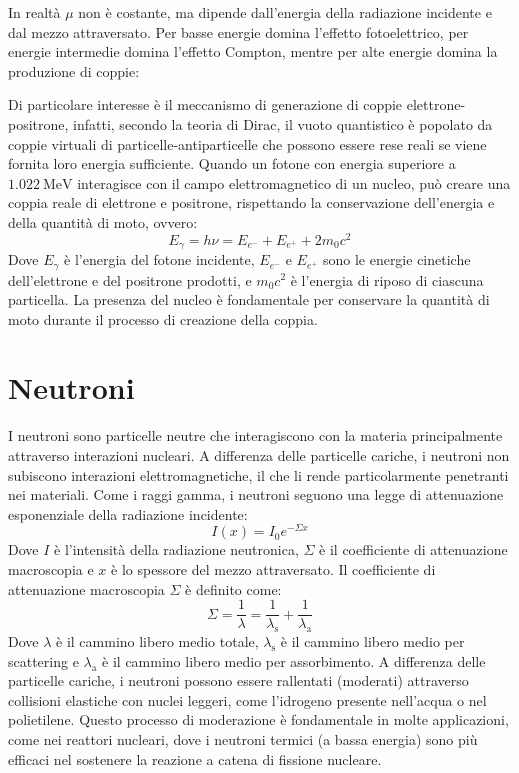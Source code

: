 
In realtà $\mu$ non è costante, ma dipende dall'energia della radiazione incidente e dal mezzo attraversato. Per basse energie domina l'effetto fotoelettrico, per energie intermedie domina l'effetto Compton, mentre per alte energie domina la produzione di coppie:


Di particolare interesse è il meccanismo di generazione di coppie elettrone-positrone, infatti, secondo la teoria di Dirac, il vuoto quantistico è popolato da coppie virtuali di particelle-antiparticelle che possono essere rese reali se viene fornita loro energia sufficiente. Quando un fotone con energia superiore a $\qty{1.022}{\mega\electronvolt}$ interagisce con il campo elettromagnetico di un nucleo, può creare una coppia reale di elettrone e positrone, rispettando la conservazione dell'energia e della quantità di moto, ovvero:
\begin{equation}
    E_{\gamma} = h\nu = E_{e^-} + E_{e^+} + 2m_0c^2
\end{equation}
Dove $E_{\gamma}$ è l'energia del fotone incidente, $E_{e^-}$ e $E_{e^+}$ sono le energie cinetiche dell'elettrone e del positrone prodotti, e $m_0c^2$ è l'energia di riposo di ciascuna particella. La presenza del nucleo è fondamentale per conservare la quantità di moto durante il processo di creazione della coppia.
\section{Neutroni}
I neutroni sono particelle neutre che interagiscono con la materia principalmente attraverso interazioni nucleari. A differenza delle particelle cariche, i neutroni non subiscono interazioni elettromagnetiche, il che li rende particolarmente penetranti nei materiali. Come i raggi gamma, i neutroni seguono una legge di attenuazione esponenziale della radiazione incidente:
\begin{equation}
    I(x) = I_0 e^{-\Sigma x}
\end{equation}
Dove $I$ è l'intensità della radiazione neutronica, $\Sigma$ è il coefficiente di attenuazione macroscopia e $x$ è lo spessore del mezzo attraversato. Il coefficiente di attenuazione macroscopia $\Sigma$ è definito come:
\begin{equation}
    \Sigma = \dfrac{1}{\lambda} = \dfrac{1}{\lambda_{\text{s}}} + \dfrac{1}{\lambda_{\text{a}}}
\end{equation}
Dove $\lambda$ è il cammino libero medio totale, $\lambda_{\text{s}}$ è il cammino libero medio per scattering e $\lambda_{\text{a}}$ è il cammino libero medio per assorbimento. A differenza delle particelle cariche, i neutroni possono essere rallentati (moderati) attraverso collisioni elastiche con nuclei leggeri, come l'idrogeno presente nell'acqua o nel polietilene. Questo processo di moderazione è fondamentale in molte applicazioni, come nei reattori nucleari, dove i neutroni termici (a bassa energia) sono più efficaci nel sostenere la reazione a catena di fissione nucleare.
